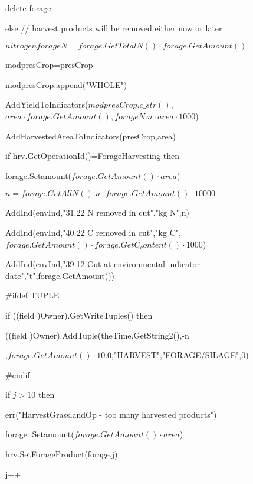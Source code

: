 \documentclass[%
]{scrartcl}
\begin{document}
{{{\quad             \quad  delete forage
                  
            

            else
             // harvest products will be removed either now or later
         
  $ nitrogen forageN = forage.GetTotalN() \cdot forage.GetAmount()$
                  
 modpresCrop=presCrop
                
  modpresCrop.append("WHOLE")
                  
AddYieldToIndicators($modpresCrop.c\_str()$,$area \cdot forage.GetAmount(),forageN.n \cdot area \cdot 1000$)
              
    AddHarvestedAreaToIndicators(presCrop,area)
                
  if hrv.GetOperationId()=ForageHarvesting then
                  
               
   \quad 	 forage.Setamount($forage.GetAmount() \cdot area$)
                 
 \quad 	 $ n=forage.GetAllN().n \cdot forage.GetAmount() \cdot 10000$
                 
 \quad   AddInd(envInd,"31.22 N removed in cut","kg N",n)
               
  \quad    AddInd(envInd,"40.22 C removed in cut","kg C",$forage.GetAmount() \cdot forage.GetC_content() \cdot 1000$)
            	
 \quad	 AddInd(envInd,"39.12 Cut at environmental indicator date","t",forage.GetAmount())
          
  \#ifdef TUPLE
                   
 \quad           if ((field  )Owner).GetWriteTuples() then

      \quad   \quad                              ((field )Owner).AddTuple(theTime.GetString2(),-n

 \quad   \quad  ,$forage.GetAmount() \cdot 10.0$,"HARVEST","FORAGE/SILAGE",0)

            \#endif

                  \quad    if $j>10$ then
                  
  \quad  	 err("HarvestGrasslandOp - too many harvested products")
               
 \quad       forage .Setamount($forage.GetAmount() \cdot area$)
               
 \quad       hrv.SetForageProduct(forage,j)
              
  \quad       j++
             
}}}
\end{document}
